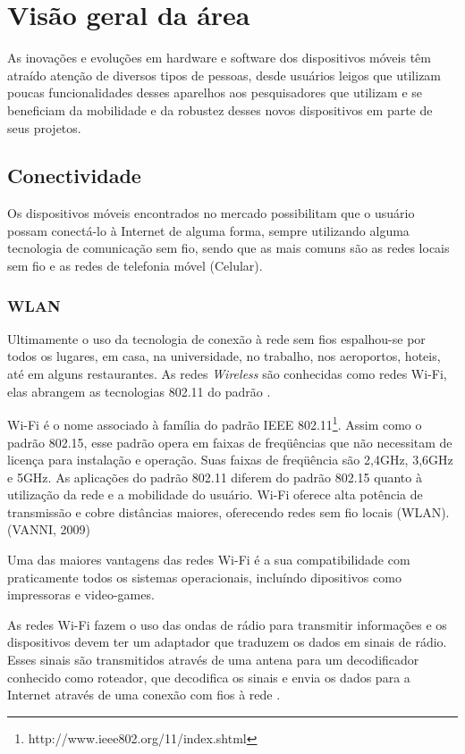 \chapter{Visão geral da área}

As inovações e evoluções em hardware e software dos dispositivos móveis têm atraído atenção de diversos tipos de pessoas, desde usuários leigos que utilizam poucas funcionalidades desses aparelhos aos pesquisadores que utilizam e se beneficiam da mobilidade e da robustez desses novos dispositivos em parte de seus projetos.

\section{Conectividade}
Os dispositivos móveis encontrados no mercado possibilitam que o usuário possam conectá-lo à Internet de alguma forma, sempre utilizando alguma tecnologia de comunicação sem fio, sendo que as mais comuns são as redes locais sem fio  e as redes de telefonia móvel (Celular).
\subsection{WLAN}
Ultimamente o uso da tecnologia de conexão à rede sem fios espalhou-se por todos os lugares, em casa, na universidade, no trabalho, nos aeroportos, hoteis, até em alguns restaurantes.
As redes \textit{Wireless} são conhecidas como redes Wi-Fi, elas abrangem as tecnologias 802.11 do padrão .
\begin{citacao}
Wi-Fi é o nome associado à família do padrão IEEE 802.11\footnote{http://www.ieee802.org/11/index.shtml}. Assim como o
padrão 802.15, esse padrão opera em faixas de freqüências que não necessitam de licença para instalação e operação. Suas faixas de freqüência são 2,4GHz, 3,6GHz e 5GHz. As aplicações do padrão 802.11 diferem do padrão 802.15 quanto à utilização da rede e a mobilidade do usuário. Wi-Fi oferece alta potência de transmissão e cobre distâncias maiores, oferecendo redes sem fio locais (WLAN). (VANNI, 2009)
\end{citacao}
Uma das maiores vantagens das redes Wi-Fi é a sua compatibilidade com praticamente todos os sistemas operacionais, incluíndo dipositivos como impressoras e video-games.

As redes Wi-Fi fazem o uso das ondas de rádio para transmitir informações e os dispositivos devem ter um adaptador que traduzem os dados em sinais de rádio. Esses sinais são transmitidos através de uma antena para um decodificador conhecido como roteador, que decodifica os sinais e envia os dados para a Internet através de uma conexão com fios à rede .

